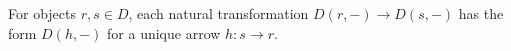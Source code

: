 For objects $r, s \in D$, each natural transformation $D(r, -) \to D(s, -)$ has the form $D(h, -)$ for a unique arrow $h \colon s \to r$.
